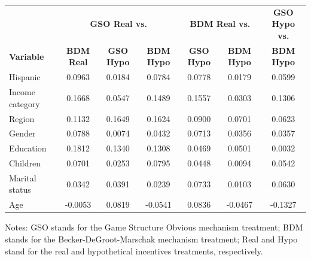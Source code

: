 \documentclass[12pt]{article}
\begin{document}
{\begin{table}[htbp!]
{\begin{tabular}{lcccccc}
\hl& \multicolumn{3}{c}{\textbf{GSO Real vs.}} & \multicolumn{2}{c}{\textbf{BDM Real vs.}} & \textbf{GSO Hypo vs.} \\
\cmidrule(lr){2-4} \cmidrule(lr){5-6} \cmidrule(lr){7-7}
\textbf{Variable}        & \textbf{BDM Real} & \textbf{GSO Hypo} & \textbf{BDM Hypo} & \textbf{GSO Hypo} & \textbf{BDM Hypo} & \textbf{BDM Hypo} \\
\midrule

Hispanic        & 0.0963        & 0.0184        & 0.0784        & 0.0778        & 0.0179        & 0.0599 \\
Income category & 0.1668        & 0.0547        & 0.1489        & 0.1557        & 0.0303        & 0.1306 \\
Region  & 0.1132        & 0.1649        & 0.1624        & 0.0900        & 0.0701        & 0.0623 \\
Gender  & 0.0788        & 0.0074        & 0.0432        & 0.0713        & 0.0356        & 0.0357 \\
Education      & 0.1812        & 0.1340        & 0.1308        & 0.0469        & 0.0501        & 0.0032 \\
Children        & 0.0701        & 0.0253        & 0.0795        & 0.0448        & 0.0094        & 0.0542 \\
Marital status  & 0.0342        & 0.0391        & 0.0239        & 0.0733        & 0.0103        & 0.0630 \\
Age     & -0.0053       & 0.0819        & -0.0541       & 0.0836        & -0.0467       & -0.1327 \\


\bottomrule
\end{tabular}}
\begin{tablenotes}
\item Notes: GSO stands for the Game Structure Obvious mechanism treatment; BDM stands for the Becker-DeGroot-Marschak mechanism treatment; Real and Hypo stand for the real and hypothetical incentives treatments, respectively.
\end{tablenotes}
\end{table}
    
 
\clearpage










}
\end{document}
